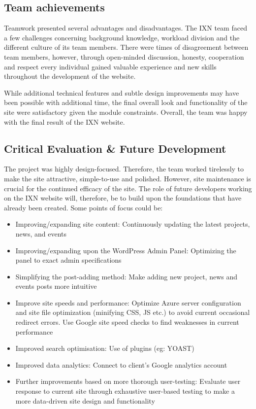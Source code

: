 \hypertarget{team-achievements}{%
\subsection{Team achievements}\label{team-achievements}}

Teamwork presented several advantages and disadvantages. The IXN team
faced a few challenges concerning background knowledge, workload
division and the different culture of its team members. There were times
of disagreement between team members, however, through open-minded
discussion, honesty, cooperation and respect every individual gained
valuable experience and new skills throughout the development of the
website.

While additional technical features and subtle design improvements may
have been possible with additional time, the final overall look and
functionality of the site were satisfactory given the module
constraints. Overall, the team was happy with the final result of the
IXN website.

\hypertarget{critical-evaluation-future-development}{%
\subsection{Critical Evaluation \& Future
Development}\label{critical-evaluation-future-development}}

The project was highly design-focused. Therefore, the team worked
tirelessly to make the site attractive, simple-to-use and polished.
However, site maintenance is crucial for the continued efficacy of the
site.\cite{g8} The role of future developers working on the IXN website
will, therefore, be to build upon the foundations that have already been
created. Some points of focus could be:

\begin{itemize}
\tightlist
\item
  Improving/expanding site content: Continuously updating the latest
  projects, news, and events
\item
  Improving/expanding upon the WordPress Admin Panel: Optimizing the
  panel to exact admin specifications
\item
  Simplifying the post-adding method: Make adding new project, news and
  events posts more intuitive
\item
  Improve site speeds and performance: Optimize Azure server
  configuration and site file optimization (minifying CSS, JS etc.) to
  avoid current occasional redirect errors. Use Google site speed checks
  to find weaknesses in current performance
\item
  Improved search optimisation: Use of plugins (eg: YOAST)
\item
  Improved data analytics: Connect to client's Google analytics account
\item
  Further improvements based on more thorough user-testing: Evaluate
  user response to current site through exhaustive user-based testing to
  make a more data-driven site design and functionality
\end{itemize}

